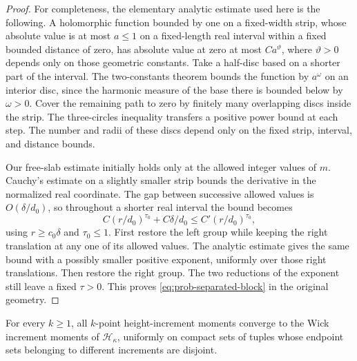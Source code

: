 \begin{proof}
For completeness, the elementary analytic estimate used here is the
following. A holomorphic function bounded by one on a fixed-width strip,
whose absolute value is at most \(a\le1\) on a fixed-length real interval
within a fixed bounded distance of zero, has absolute value at zero at
most \(C a^\vartheta\), where \(\vartheta>0\) depends only on those
geometric constants. Take a half-disc based on a shorter part of the
interval. The two-constants theorem bounds the function by
\(a^{\omega}\) on an interior disc, since the harmonic measure of the
base there is bounded below by \(\omega>0\). Cover the remaining path
to zero by finitely many overlapping discs inside the strip.
The three-circles inequality transfers a positive power bound at each
step. The number and radii of these discs depend only on the fixed
strip, interval, and distance bounds.

Our free-slab estimate initially holds only at the allowed integer
values of \(m\). Cauchy's estimate on a slightly smaller strip bounds
the derivative in the normalized real coordinate. The gap between
successive allowed values is \(O(\delta/d_0)\), so throughout a shorter
real interval the bound becomes
\[
 C(r/d_0)^{\tau_0}+C\delta/d_0
 \le C'(r/d_0)^{\tau_0},
\]
using \(r\ge c_0\delta\) and \(\tau_0\le1\).
First restore the left group while keeping the right translation at
any one of its allowed values. The analytic estimate gives the same
bound with a possibly smaller positive exponent, uniformly over those
right translations. Then restore the right group. The two reductions
of the exponent still leave a fixed \(\tau>0\). This proves
\eqref{eq:prob-separated-block} in the original geometry.
\end{proof}

\begin{proposition}\label{prop:offdiagonal}
For every \(k\ge1\), all \(k\)-point height-increment moments converge
to the Wick increment moments of \(\mathcal H_\kappa\), uniformly on
compact sets of tuples whose endpoint sets belonging to different
increments are disjoint.
\end{proposition}

